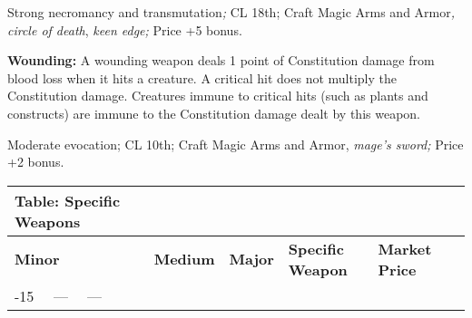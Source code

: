 Strong necromancy and transmutation\textit{; }CL 18th; Craft Magic Arms and Armor\textit{, 
circle of death}, \textit{keen edge; }Price +5 bonus.

\textbf{Wounding:} A wounding weapon deals 1 point of Constitution damage from 
blood loss when it hits a creature. A critical hit does not multiply the Constitution 
damage. Creatures immune to critical hits (such as plants and constructs) are immune 
to the Constitution damage dealt by this weapon.

Moderate evocation; CL 10th; Craft Magic Arms and Armor, \textit{mage's sword; 
}Price +2 bonus.

\vspace{12pt}
\begin{longtable}{llllllllll}
\hline
\multicolumn{5}{|p{4.212in}|}{\begin{minipage}[t]{4.212in}\raggedright
\textbf{Table: Specific Weapons}\end{minipage}}\\
\hline
\multicolumn{5}{p{0.288in}|}{\begin{minipage}[t]{0.288in}\centering
\textbf{Minor}\end{minipage}} & \multicolumn{1}{|p{0.530in}|}{\begin{minipage}[t]{0.530in}\centering
\textbf{Medium}\end{minipage}} & \multicolumn{1}{p{0.601in}|}{\begin{minipage}[t]{0.601in}\centering
\textbf{Major}\end{minipage}} & \multicolumn{1}{p{0.499in}|}{\begin{minipage}[t]{0.499in}\centering
\textbf{Specific Weapon}\end{minipage}} & \multicolumn{1}{p{1.741in}|}{\begin{minipage}[t]{1.741in}\raggedleft
\textbf{Market Price}\end{minipage}}\\
\hline
\multicolumn{1}{p{0.841in}|}{\begin{minipage}[t]{0.841in}\centering
01-15\end{minipage}} & \multicolumn{1}{p{0.058in}|}{\begin{minipage}[t]{0.058in}\centering
---\end{minipage}} & \multicolumn{1}{p{0.058in}|}{\begin{minipage}[t]{0.058in}\centering
---\end{minipage}} & \multicolumn{1}{p{0.058in}|}{\begin{minipage}[t]{0.058in}\centering

\end{minipage}}
\end{longtable}
